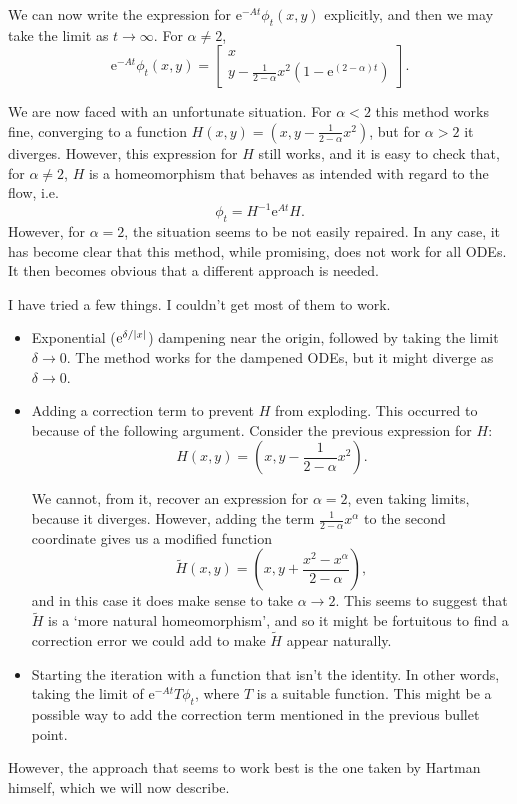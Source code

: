 \documentclass{article}
\newcommand{\e}{\mathrm{e}}
\DeclarePairedDelimiter{\abs}{\lvert}{\rvert}
\begin{document}
We can now write the expression for $\e^{-At} \phi_t (x,y)$ explicitly, and then we may take the limit as $t \to \infty$. For $\alpha \neq 2$,
\begin{equation}\label{flowsimple}
\e^{-At} \phi_t (x,y) =
\begin{bmatrix}
x\\
y - \frac1{2-\alpha} x^2 (1 - \e^{(2-\alpha)t})
\end{bmatrix}.
\end{equation}

We are now faced with an unfortunate situation. For $\alpha < 2$ this method works fine, converging to a function $H(x,y) = (x, y-\frac1{2-\alpha} x^2)$, but for $\alpha > 2$ it diverges. However, this expression for $H$ still works, and it is easy to check that, for $\alpha \neq 2$, $H$ is a homeomorphism that behaves as intended with regard to the flow, i.e.
\[\phi_t = H^{-1} \e^{A t} H.\]
However, for $\alpha = 2$, the situation seems to be not easily repaired. In any case, it has become clear that this method, while promising, does not work for all ODEs. It then becomes obvious that a different approach is needed.

I have tried a few things. I couldn't get most of them to work.
\begin{itemize}
\item Exponential ($\e^{\delta/\abs{x}}$) dampening near the origin, followed by taking the limit $\delta \to 0$. The method works for the dampened ODEs, but it might diverge as $\delta \to 0$.

\item Adding a correction term to prevent $H$ from exploding. This occurred to because of the following argument. Consider the previous expression for $H$:
\[H(x,y) = (x,y - \frac1{2-\alpha} x^2).\]

We cannot, from it, recover an expression for $\alpha = 2$, even taking limits, because it diverges. However, adding the term $\frac1{2-\alpha} x^\alpha$ to the second coordinate gives us a modified function
\[\tilde H(x,y) = (x,y + \frac{x^2 - x^\alpha}{2-\alpha}),\]
and in this case it does make sense to take $\alpha \to 2$. This seems to suggest that $\tilde H$ is a `more natural homeomorphism', and so it might be fortuitous to find a correction error we could add to make $\tilde H$ appear naturally.

\item Starting the iteration with a function that isn't the identity. In other words, taking the limit of $\e^{-A t} T \phi_t$, where $T$ is a suitable function. This might be a possible way to add the correction term mentioned in the previous bullet point.
\end{itemize}

However, the approach that seems to work best is the one taken by Hartman himself, which we will now describe.
\end{document}
